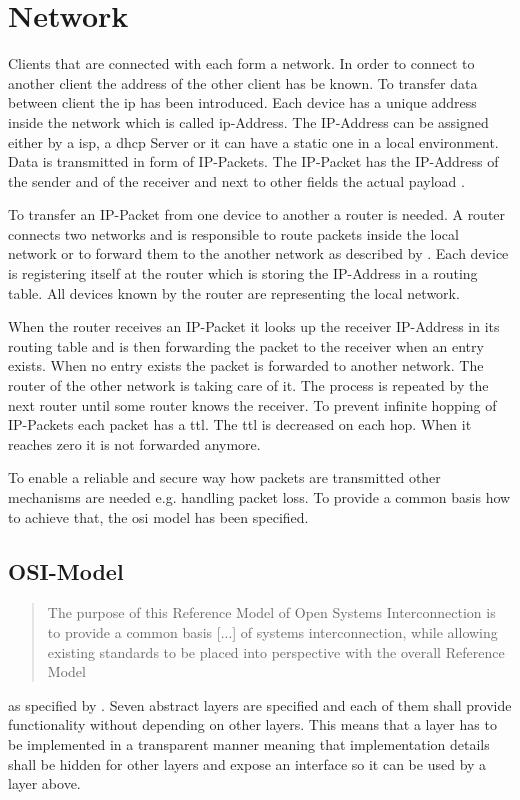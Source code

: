 \section{Network}
Clients that are connected with each form a network. In order to connect to another client the address of the other client has be known. To transfer data between client the \gls{ip} has been introduced. Each device has a unique address inside the network which is called \gls{ip}-Address. The IP-Address can be assigned either by a \gls{isp}, a \gls{dhcp} Server or it can have a static one in a local environment. 
Data is transmitted in form of IP-Packets. The IP-Packet has the IP-Address of the sender and of the receiver and next to other fields the actual payload \cite{roberts}.

To transfer an IP-Packet from one device to another a router is needed. A router connects two networks and is responsible to route packets inside the local network or to forward them to the another network as described by \citet{shuler2002}.
Each device is registering itself at the router which is storing the IP-Address in a routing table. All devices known by the router are representing the local network. 

When the router receives an IP-Packet it looks up the receiver IP-Address in its routing table and is then forwarding the packet to the receiver when an entry exists.
When no entry exists the packet is forwarded to another network. The router of the other network is taking care of it. The process is repeated by the next router until some router knows the receiver.
To prevent infinite hopping of IP-Packets each packet has a \gls{ttl}. The \gls{ttl} is decreased on each hop. When it reaches zero it is not forwarded anymore. 

To enable a reliable and secure way how packets are transmitted other mechanisms are needed e.g. handling packet loss. 
To provide a common basis how to achieve that, the \gls{osi} model has been specified.

\subsection{OSI-Model}
\blockquote{The purpose of this Reference Model of Open Systems Interconnection is to provide a common basis [...] of systems interconnection, while allowing existing standards to be placed into perspective with the overall Reference Model} as specified by \citet{ISO1064-osi-model}. Seven abstract layers are specified and each of them shall provide functionality without depending on other layers. This means that a layer has to be implemented in a transparent manner meaning that implementation details shall be hidden for other layers and expose an interface so it can be used by a layer above.

